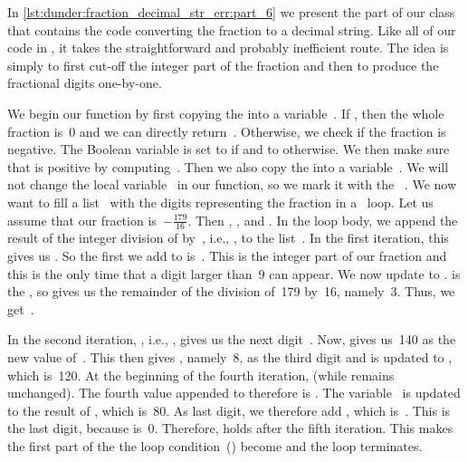 In \cref{lst:dunder:fraction_decimal_str_err:part_6} we present the part of our class  that contains the code converting the fraction to a decimal string.
Like all of our code in , it takes the straightforward and probably inefficient route.
The idea is simply to first cut-off the integer part of the fraction and then to produce the fractional digits one-by-one.

We begin our function  by first copying the  into a variable~.
If , then the whole fraction is~0 and we can directly return~.
Otherwise, we check if the fraction is negative.
The Boolean variable  is set to  if  and to  otherwise.
We then make sure that  is positive by computing~.
Then we also copy the  into a variable~.
We will not change the local variable~ in our function, so we mark it with the ~.%
%
%
%
We now want to fill a list~ with the digits representing the fraction in a ~loop.
Let us assume that our fraction is~$-\frac{179}{16}$.
Then , , and .
In the loop body, we append the result of the integer division of  by~, i.e., , to the list~.
In the first iteration, this gives us .
So the first  we add to  is~.
This is the integer part of our fraction and this is the only time that a digit larger than~9 can appear.
We now update  to .
\pythonilIdx{\%} is the , so  gives us the remainder of the division of~179 by~16, namely~3.
Thus, we get~.

In the second iteration, , i.e., , gives us the next digit~.
Now,  gives us~140 as the new value of~.
This then gives , namely~8, as the third digit and  is updated to , which is~120.
At the beginning of the fourth iteration,  (while  remains unchanged).
The fourth value appended to  therefore is .
The variable~ is updated to the result of , which is~80.
As last digit, we therefore add , which is~.
This is the last digit, because  is~0.
Therefore,  holds after the fifth iteration.
This makes the first part of the the loop condition~() become  and the loop terminates.

